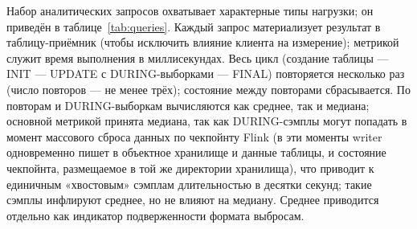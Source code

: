 Набор аналитических запросов охватывает характерные типы нагрузки; он приведён в
таблице~\ref{tab:queries}. Каждый запрос материализует результат в таблицу-приёмник
(чтобы исключить влияние клиента на измерение); метрикой служит время выполнения в
миллисекундах. Весь цикл (создание таблицы --- INIT --- UPDATE с DURING-выборками ---
FINAL) повторяется несколько раз (число повторов --- не менее трёх); состояние между
повторами сбрасывается. По повторам и DURING-выборкам вычисляются как среднее, так
и медиана; основной метрикой принята медиана, так как DURING-сэмплы могут
попадать в момент массового сброса данных по чекпойнту Flink (в эти моменты writer
одновременно пишет в объектное хранилище и данные таблицы, и состояние чекпойнта,
размещаемое в той же директории хранилища), что приводит к единичным «хвостовым»
сэмплам длительностью в десятки секунд; такие сэмплы инфлируют среднее, но не
влияют на медиану. Среднее приводится отдельно как индикатор подверженности
формата выбросам.

